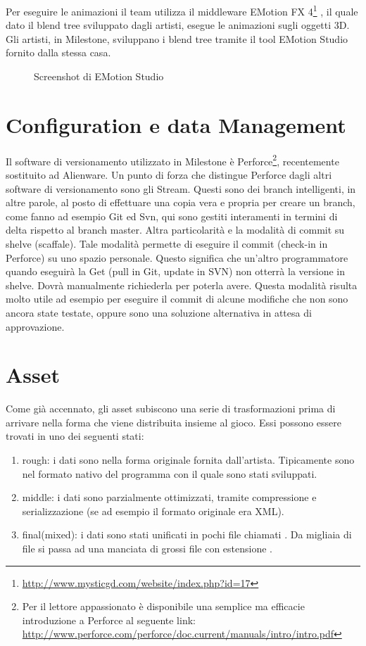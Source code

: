 Per eseguire le animazioni il team utilizza il middleware EMotion FX 4\footnote{\url{http://www.mysticgd.com/website/index.php?id=17}} , il quale dato il \gls{blend tree} sviluppato dagli artisti, esegue le animazioni sugli oggetti 3D. Gli artisti, in Milestone, sviluppano i blend tree tramite il tool EMotion Studio fornito dalla stessa casa.

\begin{figure}
	\centering
	\caption{Screenshot di EMotion Studio}
	\label{fig:screenshot-emotion-studio}
\end{figure}

\section{Configuration e data Management}

Il software di versionamento utilizzato in Milestone è \gls{Perforce}\footnote{Per il lettore appassionato è disponibile una semplice ma efficacie introduzione a Perforce al seguente link: \url{http://www.perforce.com/perforce/doc.current/manuals/intro/intro.pdf}}, recentemente sostituito ad \gls{Alienware}. Un punto di forza che distingue Perforce dagli altri software di versionamento sono gli Stream. Questi sono dei branch intelligenti, in altre parole, al posto di effettuare una copia vera e propria per creare un branch, come fanno ad esempio Git ed Svn, qui sono gestiti interamenti in termini di \gls{delta} rispetto al branch master. Altra particolarità e la modalità di commit su shelve (scaffale). Tale modalità permette di eseguire il commit (check-in in Perforce) su uno spazio personale. Questo significa che un'altro programmatore quando eseguirà la Get (pull in Git, update in SVN) non otterrà la versione in shelve. Dovrà manualmente richiederla per poterla avere. Questa modalità risulta molto utile ad esempio per eseguire il commit di alcune modifiche che non sono ancora state testate, oppure sono una soluzione alternativa in attesa di approvazione.

\section{Asset}
\label{sec:asset}

Come già accennato, gli asset subiscono una serie di trasformazioni prima di arrivare nella forma che viene distribuita insieme al gioco. Essi possono essere trovati in uno dei seguenti stati:
\begin{enumerate}
	\item rough: i dati sono nella forma originale fornita dall'artista. Tipicamente sono nel formato nativo del programma con il quale sono stati sviluppati.
	\item middle: i dati sono parzialmente ottimizzati, tramite compressione e \gls{serializzazione} (se ad esempio il formato originale era XML).
	\item final(mixed): i dati sono stati unificati in pochi file chiamati . Da migliaia di file si passa ad una manciata di grossi file con estensione .
\end{enumerate}

